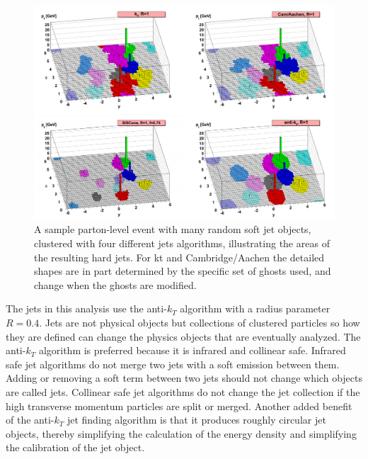 \begin{figure}[h!]
	\centering
	\includegraphics[width=\columnwidth]{../ThesisImages/Simulation/VarJetAlgs.png}
	\caption[A sample parton-level event with many random soft jet objects, clustered with four different jets algorithms, illustrating the areas of the resulting hard jets. For kt and Cambridge/Aachen the detailed shapes are in part determined by the specific set of ghosts used, and change when the ghosts are modified.]{A sample parton-level event with many random soft jet objects, clustered with four different jets algorithms, illustrating the areas of the resulting hard jets. For kt and Cambridge/Aachen the detailed shapes are in part determined by the specific set of ghosts used, and change when the ghosts are modified\cite{antikt}. 
	}
	\label{fig:VarJetAlgs}
\end{figure}

The jets in this analysis use the anti-$k_T$ algorithm \cite{antikt} with a radius parameter $R=0.4$.  Jets are not physical objects but collections of clustered particles so how they are defined can change the physics objects that are eventually analyzed.  The anti-$k_T$ algorithm is preferred because it is infrared and collinear safe.  Infrared safe jet algorithms do not merge two jets with a soft emission between them.  Adding or removing a soft term between two jets should not change which objects are called jets.  Collinear safe jet algorithms do not change the jet collection if the high transverse momentum particles are split or merged.  Another added benefit of the anti-$k_T$ jet finding algorithm is that it produces roughly circular jet objects, thereby simplifying the calculation of the energy density and simplifying the calibration of the jet object.

